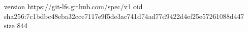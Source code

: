 version https://git-lfs.github.com/spec/v1
oid sha256:7c1bdbc48eba32cce7117e9f5de3ac741d74ad77d9422d4ef25e57261088d447
size 844
